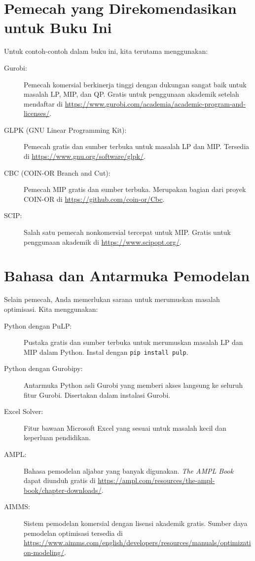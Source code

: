 \section{Pemecah yang Direkomendasikan untuk Buku Ini}

Untuk contoh-contoh dalam buku ini, kita terutama menggunakan:

\begin{description}
\item[Gurobi:] Pemecah komersial berkinerja tinggi dengan dukungan sangat baik untuk masalah LP, MIP, dan QP. Gratis untuk penggunaan akademik setelah mendaftar di \url{https://www.gurobi.com/academia/academic-program-and-licenses/}.

\item[GLPK (GNU Linear Programming Kit):] Pemecah gratis dan sumber terbuka untuk masalah LP dan MIP. Tersedia di \url{https://www.gnu.org/software/glpk/}.

\item[CBC (COIN-OR Branch and Cut):] Pemecah MIP gratis dan sumber terbuka. Merupakan bagian dari proyek COIN-OR di \url{https://github.com/coin-or/Cbc}.

\item[SCIP:] Salah satu pemecah nonkomersial tercepat untuk MIP. Gratis untuk penggunaan akademik di \url{https://www.scipopt.org/}.
\end{description}

\section{Bahasa dan Antarmuka Pemodelan}

Selain pemecah, Anda memerlukan sarana untuk merumuskan masalah optimisasi. Kita menggunakan:

\begin{description}
\item[Python dengan PuLP:] Pustaka gratis dan sumber terbuka untuk merumuskan masalah LP dan MIP dalam Python. Instal dengan \texttt{pip install pulp}.

\item[Python dengan Gurobipy:] Antarmuka Python asli Gurobi yang memberi akses langsung ke seluruh fitur Gurobi. Disertakan dalam instalasi Gurobi.

\item[Excel Solver:] Fitur bawaan Microsoft Excel yang sesuai untuk masalah kecil dan keperluan pendidikan.

\item[AMPL:] Bahasa pemodelan aljabar yang banyak digunakan. \emph{The AMPL Book} dapat diunduh gratis di \url{https://ampl.com/resources/the-ampl-book/chapter-downloads/}.

\item[AIMMS:] Sistem pemodelan komersial dengan lisensi akademik gratis. Sumber daya pemodelan optimisasi tersedia di \url{https://www.aimms.com/english/developers/resources/manuals/optimization-modeling/}.
\end{description}

